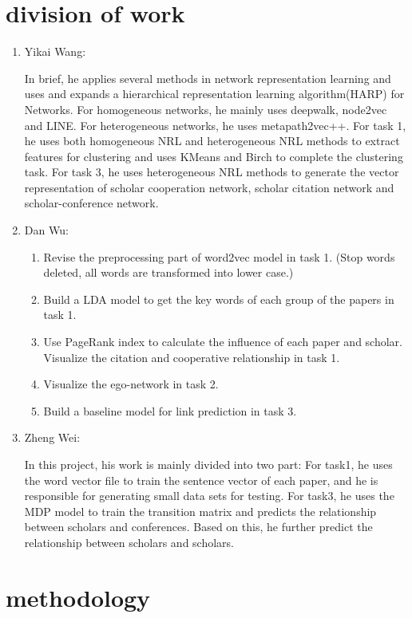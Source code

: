 \documentclass[conference]{IEEEtran}
\begin{document}
\section{division of work}
\begin{enumerate}
\item Yikai Wang: 

In brief, he applies several methods in network representation learning and uses and expands a hierarchical representation learning algorithm(HARP) for Networks. For homogeneous networks, he mainly uses deepwalk, node2vec and LINE. For heterogeneous networks, he uses metapath2vec++. For task 1, he uses both homogeneous NRL and heterogeneous NRL methods to extract features for clustering and uses KMeans and Birch to complete the clustering task. For task 3, he uses heterogeneous NRL methods to generate the vector representation of scholar cooperation network, scholar citation network and scholar-conference network.
\item Dan Wu:
\begin{enumerate}
\item Revise the preprocessing part of word2vec model in task 1. (Stop words deleted, all words are transformed into lower case.)
\item Build a LDA model to get the key words of each group of the papers in task 1.
\item Use PageRank index to calculate the influence of each paper and scholar. Visualize  the citation and cooperative relationship in task 1.
\item Visualize the ego-network in task 2.
\item Build a baseline model for link prediction in task 3.
\end{enumerate}
\item Zheng Wei:

In this project, his work is mainly divided into two part: For task1, he uses the word vector file to train the sentence vector of each paper, and he  is responsible for generating small data sets for testing. For task3, he uses the MDP model to train the transition matrix and predicts the relationship between scholars and conferences. Based on this, he further predict the relationship between scholars and scholars.
\end{enumerate}
\section{methodology}
\end{document}

